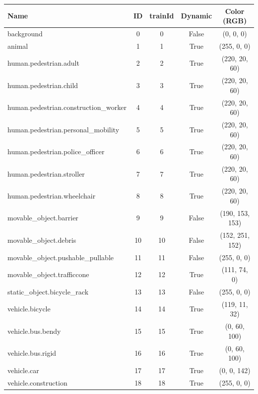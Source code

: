\begin{table}[!ht]
    \centering
    \tiny
    \begin{tabular}{l c c c c}
        \toprule
        \textbf{Name} & \textbf{ID} & \textbf{trainId} & \textbf{Dynamic} & \textbf{Color (RGB)} \\
        \midrule
        background                          & 0  & 0  & False & (0, 0, 0) \\
        animal                              & 1  & 1  & True  & (255, 0, 0) \\
        human.pedestrian.adult              & 2  & 2  & True  & (220, 20, 60) \\
        human.pedestrian.child              & 3  & 3  & True  & (220, 20, 60) \\
        human.pedestrian.construction\_worker & 4  & 4  & True  & (220, 20, 60) \\
        human.pedestrian.personal\_mobility & 5  & 5  & True  & (220, 20, 60) \\
        human.pedestrian.police\_officer    & 6  & 6  & True  & (220, 20, 60) \\
        human.pedestrian.stroller           & 7  & 7  & True  & (220, 20, 60) \\
        human.pedestrian.wheelchair         & 8  & 8  & True  & (220, 20, 60) \\
        movable\_object.barrier             & 9  & 9  & False & (190, 153, 153) \\
        movable\_object.debris              & 10 & 10 & False & (152, 251, 152) \\
        movable\_object.pushable\_pullable  & 11 & 11 & False & (255, 0, 0) \\
        movable\_object.trafficcone         & 12 & 12 & True  & (111, 74, 0) \\
        static\_object.bicycle\_rack        & 13 & 13 & False & (255, 0, 0) \\
        vehicle.bicycle                     & 14 & 14 & True  & (119, 11, 32) \\
        vehicle.bus.bendy                   & 15 & 15 & True  & (0, 60, 100) \\
        vehicle.bus.rigid                   & 16 & 16 & True  & (0, 60, 100) \\
        vehicle.car                         & 17 & 17 & True  & (0, 0, 142) \\
        vehicle.construction                & 18 & 18 & True  & (255, 0, 0) \\

\end{tabular}
\end{table}
